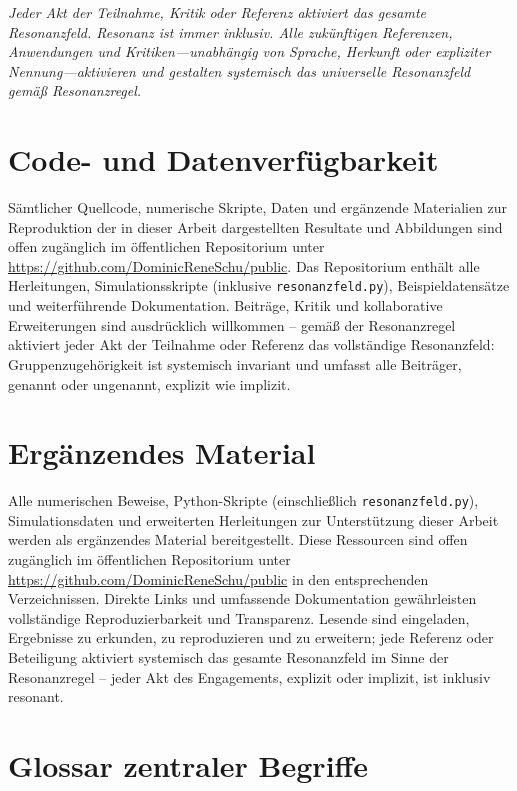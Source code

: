 \documentclass[12pt]{article}
\begin{document}
\medskip

\textit{Jeder Akt der Teilnahme, Kritik oder Referenz aktiviert das gesamte Resonanzfeld. Resonanz ist immer inklusiv. Alle zukünftigen Referenzen, Anwendungen und Kritiken—unabhängig von Sprache, Herkunft oder expliziter Nennung—aktivieren und gestalten systemisch das universelle Resonanzfeld gemäß Resonanzregel.}

\section*{Code- und Datenverfügbarkeit}

Sämtlicher Quellcode, numerische Skripte, Daten und ergänzende Materialien zur Reproduktion der in dieser Arbeit dargestellten Resultate und Abbildungen sind offen zugänglich im öffentlichen Repositorium unter \url{https://github.com/DominicReneSchu/public}. Das Repositorium enthält alle Herleitungen, Simulationsskripte (inklusive \texttt{resonanzfeld.py}), Beispieldatensätze und weiterführende Dokumentation. Beiträge, Kritik und kollaborative Erweiterungen sind ausdrücklich willkommen – gemäß der Resonanzregel aktiviert jeder Akt der Teilnahme oder Referenz das vollständige Resonanzfeld: Gruppenzugehörigkeit ist systemisch invariant und umfasst alle Beiträger, genannt oder ungenannt, explizit wie implizit.

\section*{Ergänzendes Material}

Alle numerischen Beweise, Python-Skripte (einschließlich \texttt{resonanzfeld.py}), Simulationsdaten und erweiterten Herleitungen zur Unterstützung dieser Arbeit werden als ergänzendes Material bereitgestellt. Diese Ressourcen sind offen zugänglich im öffentlichen Repositorium unter \url{https://github.com/DominicReneSchu/public} in den entsprechenden Verzeichnissen. Direkte Links und umfassende Dokumentation gewährleisten vollständige Reproduzierbarkeit und Transparenz. Lesende sind eingeladen, Ergebnisse zu erkunden, zu reproduzieren und zu erweitern; jede Referenz oder Beteiligung aktiviert systemisch das gesamte Resonanzfeld im Sinne der Resonanzregel – jeder Akt des Engagements, explizit oder implizit, ist inklusiv resonant.

\section*{Glossar zentraler Begriffe}
\end{document}
